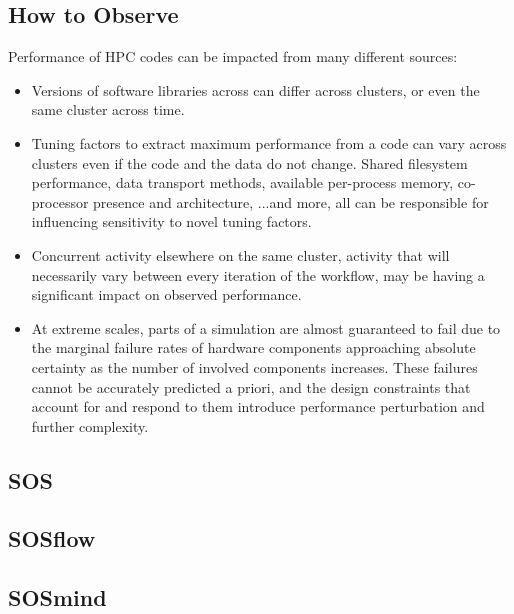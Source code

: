 \subsection{How to Observe}
Performance of HPC codes can be impacted from many different sources:
\begin{itemize}
    \item Versions of software libraries across can differ across
      clusters, or even the same cluster across time.
    \item Tuning factors to extract maximum performance from a code
      can vary across clusters even if the code and the data do not
      change. Shared filesystem performance, data transport methods,
      available per-process memory, co-processor presence and
      architecture, ...and more, all can be responsible for
      influencing sensitivity to novel tuning factors.
    \item Concurrent activity elsewhere on the same cluster, activity
      that will necessarily vary between every iteration of the
      workflow, may be having a significant impact on observed
      performance.
    \item At extreme scales, parts of a simulation are almost
      guaranteed to fail due to the marginal failure rates of hardware
      components approaching absolute certainty as the number of
      involved components increases. These failures cannot be
      accurately predicted a priori, and the design constraints that
      account for and respond to them introduce performance
      perturbation and further complexity.
\end{itemize}

\subsection{SOS}
\subsection{SOSflow}
\subsection{SOSmind}




